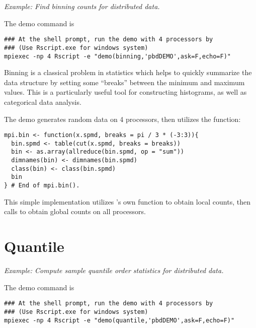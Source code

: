 \emph{Example:  Find binning counts for distributed data.}

The demo command is
\begin{lstlisting}
### At the shell prompt, run the demo with 4 processors by
### (Use Rscript.exe for windows system)
mpiexec -np 4 Rscript -e "demo(binning,'pbdDEMO',ask=F,echo=F)"
\end{lstlisting}

Binning is a classical problem in statistics which helps to quickly summarize
the data structure by setting some ``breaks'' between the minimum and maximum
values.
This is a particularly useful tool for constructing histograms, as well as
categorical data analysis.

The demo generates random data on 4 processors, then
utilizes the  function:
\begin{lstlisting}[language=rr,title=R Code]
mpi.bin <- function(x.spmd, breaks = pi / 3 * (-3:3)){
  bin.spmd <- table(cut(x.spmd, breaks = breaks))
  bin <- as.array(allreduce(bin.spmd, op = "sum"))
  dimnames(bin) <- dimnames(bin.spmd)
  class(bin) <- class(bin.spmd)
  bin
} # End of mpi.bin().
\end{lstlisting}
This simple implementation utilizes 's own 
function to obtain local counts, then calls
to obtain global counts on all processors.






\section[Quantile]{Quantile}%
\label{sec:quantile}

\emph{Example:  Compute sample quantile order statistics for distributed data.}

The demo command is
\begin{lstlisting}
### At the shell prompt, run the demo with 4 processors by
### (Use Rscript.exe for windows system)
mpiexec -np 4 Rscript -e "demo(quantile,'pbdDEMO',ask=F,echo=F)"
\end{lstlisting}

